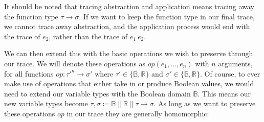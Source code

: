         \begin{prooftree}
        \end{prooftree}

        \begin{prooftree}
        \end{prooftree}

        It should be noted that tracing abstraction and application means tracing away the function type $\tau\to\sigma$.
        If we want to keep the function type in our final trace, we cannot trace away abstraction, and the application process would end with the trace of $e_2$, rather than the trace of $e_1\ e_2$.

        We can then extend this with the basic operations we wish to preserve through our trace.
        We will denote these operations as $op(e_1,\dots,e_n)$ with $n$ arguments, for all functions $op:\tau'^n\to\sigma'$ where $\tau'\in\{\mathbb{B},\mathbb{R}\}$ and $\sigma'\in\{\mathbb{B},\mathbb{R}\}$.
        Of course, to ever make use of operations that either take in or produce Boolean values, we would need to extend our variable types with the Boolean domain $\mathbb{B}$.
        This means our new variable types become $\tau,\sigma\coloneqq\mathbb{B}\|\mathbb{R}\|\tau\to\sigma$.
        As long as we want to preserve these operations $op$ in our trace they are generally homomorphic:

        \begin{prooftree}
        \end{prooftree}

        \begin{prooftree}
        \end{prooftree}

